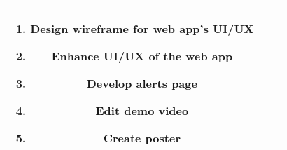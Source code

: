 \begin{table*}[htbp]
\begin{center}
\begin{tabular}{|c|c|p{10cm}|}
\begin{enumerate}[leftmargin=*]
				                                         \item Design wireframe for web app's UI/UX
				                                         \item Enhance UI/UX of the web app
				                                         \item Develop alerts page
				                                         \item Edit demo video
				                                         \item Create poster
			                                         \end{enumerate}
			\\
			\hline
		\end{tabular}
	\end{center}
	\label{tab-divsion-of-task}
\end{table*}